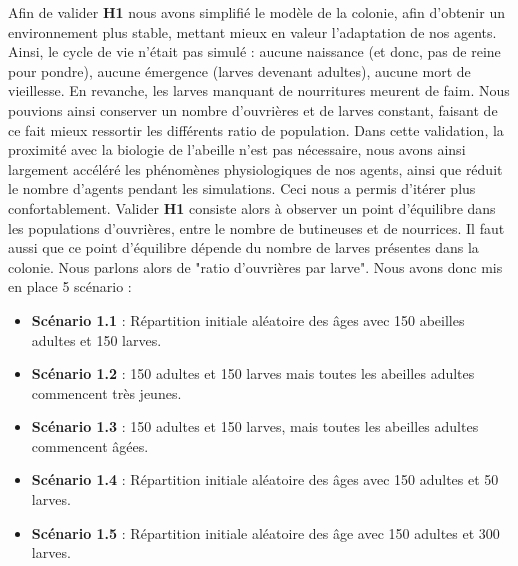 			Afin de valider \textbf{H1} nous avons simplifié le modèle de la colonie, afin d'obtenir un environnement plus stable, mettant mieux en valeur l'adaptation de nos agents. Ainsi, le cycle de vie n'était pas simulé : aucune naissance (et donc, pas de reine pour pondre), aucune émergence (larves devenant adultes), aucune mort de vieillesse. En revanche, les larves manquant de nourritures meurent de faim. Nous pouvions ainsi conserver un nombre d'ouvrières et de larves constant, faisant de ce fait mieux ressortir les différents ratio de population. Dans cette validation, la proximité avec la biologie de l'abeille n'est pas nécessaire, nous avons ainsi largement accéléré les phénomènes physiologiques de nos agents, ainsi que réduit le nombre d'agents pendant les simulations. Ceci nous a permis d'itérer plus confortablement. Valider \textbf{H1} consiste alors à observer un point d'équilibre dans les populations d'ouvrières, entre le nombre de butineuses et de nourrices. Il faut aussi que ce point d'équilibre dépende du nombre de larves présentes dans la colonie. Nous parlons alors de "ratio d'ouvrières par larve". Nous avons donc mis en place 5 scénario :
			\begin{itemize}
				\item \textbf{Scénario 1.1} : Répartition initiale aléatoire des âges avec 150 abeilles adultes et 150 larves.
				\item \textbf{Scénario 1.2} : 150 adultes et 150 larves mais toutes les abeilles adultes commencent très jeunes.
				\item \textbf{Scénario 1.3} : 150 adultes et 150 larves, mais toutes les abeilles adultes commencent âgées.
				\item \textbf{Scénario 1.4} : Répartition initiale aléatoire des âges avec 150 adultes et 50 larves.
				\item \textbf{Scénario 1.5} : Répartition initiale aléatoire des âge avec 150 adultes et 300 larves.
			\end{itemize}
			
